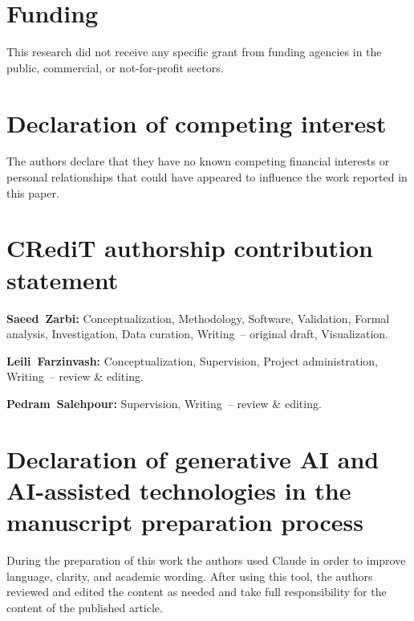 \section*{Funding}
This research did not receive any specific grant from funding agencies in the public, commercial, or not-for-profit sectors.

\section*{Declaration of competing interest}
The authors declare that they have no known competing financial interests or personal relationships that could have appeared to influence the work reported in this paper.

\section*{CRediT authorship contribution statement}
\textbf{Saeed~Zarbi:} Conceptualization, Methodology, Software, Validation, Formal analysis, Investigation, Data curation, Writing~-- original draft, Visualization.\par
\textbf{Leili~Farzinvash:} Conceptualization, Supervision, Project administration, Writing~-- review \& editing.\par
\textbf{Pedram~Salehpour:} Supervision, Writing~-- review \& editing.

\section*{Declaration of generative AI and AI-assisted technologies in the manuscript preparation process}
During the preparation of this work the authors used Claude in order to improve language, clarity, and academic wording. After using this tool, the authors reviewed and edited the content as needed and take full responsibility for the content of the published article.

\clearpage





